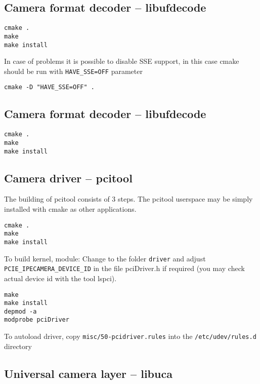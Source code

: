 \subsection{Camera format decoder -- libufdecode}
\begin{verbatim}
cmake .
make 
make install
\end{verbatim}


In case of problems it is possible to disable SSE support, in this case cmake should be run with \verb/HAVE_SSE=OFF/ parameter
\begin{verbatim}
cmake -D "HAVE_SSE=OFF" .
\end{verbatim}


\subsection{Camera format decoder -- libufdecode}
\begin{verbatim}
cmake .
make 
make install
\end{verbatim}


\subsection{Camera driver -- pcitool}
The building of pcitool consists of 3 steps. The pcitool userspace may be simply installed with cmake as other applications.
\begin{verbatim}
cmake .
make
make install
\end{verbatim}

To build kernel, module:
Change to the folder \verb/driver/ and adjust  \verb/PCIE_IPECAMERA_DEVICE_ID/ in the file pciDriver.h if required (you may check actual device id with the tool lspci).
\begin{verbatim}
make
make install
depmod -a
modprobe pciDriver
\end{verbatim}
To autoload driver, copy \verb|misc/50-pcidriver.rules| into the \verb|/etc/udev/rules.d| directory



\subsection{Universal camera layer -- libuca}




